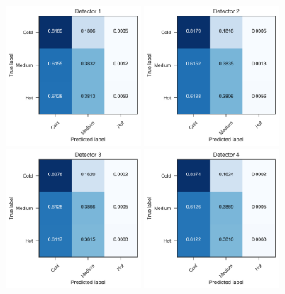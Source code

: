 \begin{figure}
\centering
\includegraphics[width=0.45\textwidth]{drift_cm_Detector1.png}
\includegraphics[width=0.45\textwidth]{drift_cm_Detector2.png}
\includegraphics[width=0.45\textwidth]{drift_cm_Detector3.png}
\includegraphics[width=0.45\textwidth]{drift_cm_Detector4.png}

\end{figure}

